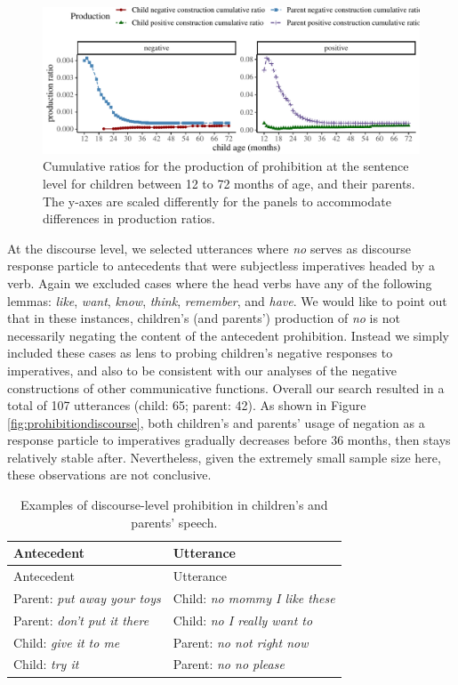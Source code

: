 \documentclass[
  english,
  man,floatsintext]{apa6}
\begin{document}
\begin{figure}[H]

{\centering \includegraphics{neg_construction_article_files/figure-latex/prohibition-1} 

}

\caption{Cumulative ratios for the production of prohibition at the sentence level for children between 12 to 72 months of age, and their parents. The y-axes are scaled differently for the panels to accommodate differences in production ratios.}\label{fig:prohibition}
\end{figure}

At the discourse level, we selected utterances where \emph{no} serves as discourse response particle to antecedents that were subjectless imperatives headed by a verb. Again we excluded cases where the head verbs have any of the following lemmas: \emph{like}, \emph{want}, \emph{know}, \emph{think}, \emph{remember}, and \emph{have}. We would like to point out that in these instances, children's (and parents') production of \emph{no} is not necessarily negating the content of the antecedent prohibition. Instead we simply included these cases as lens to probing children's negative responses to imperatives, and also to be consistent with our analyses of the negative constructions of other communicative functions. Overall our search resulted in a total of 107 utterances (child: 65; parent: 42).
As shown in Figure \ref{fig:prohibitiondiscourse}, both children's and parents' usage of negation as a response particle to imperatives gradually decreases before 36 months, then stays relatively stable after. Nevertheless, given the extremely small sample size here, these observations are not conclusive.

\begin{longtable}[]{@{}ll@{}}
\caption{\label{tab:disprohib} Examples of discourse-level prohibition in children's and parents' speech.}\tabularnewline
\toprule
Antecedent & Utterance \\
\midrule
\endfirsthead
\toprule
Antecedent & Utterance \\
\midrule
\endhead
Parent: \emph{put away your toys} & Child: \emph{no mommy I like these} \\
Parent: \emph{don't put it there} & Child: \emph{no I really want to} \\
Child: \emph{give it to me} & Parent: \emph{no not right now} \\
Child: \emph{try it} & Parent: \emph{no no please} \\
\bottomrule
\end{longtable}
\end{document}
